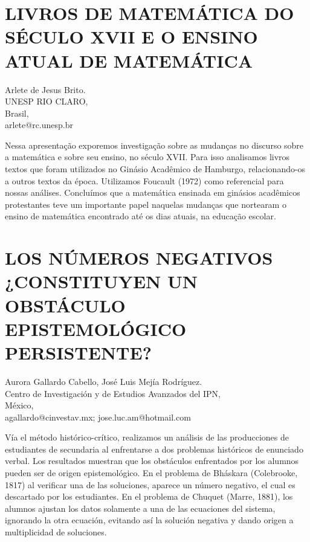 \section{LIVROS DE MATEMÁTICA DO SÉCULO XVII E O ENSINO ATUAL DE MATEMÁTICA}

\begin{datos}
Arlete de Jesus Brito. \\
UNESP RIO CLARO,\\
\hfill Brasil, \\
 \hfill arlete@rc.unesp.br 
\end{datos}

Nessa apresentação exporemos investigação sobre as mudanças no discurso
sobre a matemática e sobre seu ensino, no século XVII. Para isso analisamos
livros textos que foram utilizados no Ginásio Acadêmico de Hamburgo,
relacionando-os a outros textos da época. Utilizamos Foucault (1972)
como referencial para nossas análises. Concluímos que a matemática
ensinada em ginásios acadêmicos protestantes teve um importante papel
naquelas mudanças que nortearam o ensino de matemática encontrado
até os dias atuais, na educação escolar.


\section{LOS NÚMEROS NEGATIVOS ¿CONSTITUYEN UN OBSTÁCULO EPISTEMOLÓGICO PERSISTENTE? }

\begin{datos}
Aurora Gallardo Cabello, José Luis Mejía Rodríguez. \\
Centro de Investigación y de Estudios Avanzados del IPN,\\
\hfill México, \\
 \hfill agallardo@cinvestav.mx; jose.luc.am@hotmail.com 
\end{datos}

Vía el método histórico-crítico, realizamos un análisis de las producciones
de estudiantes de secundaria al enfrentarse a dos problemas históricos
de enunciado verbal. Los resultados muestran que los obstáculos enfrentados
por los alumnos pueden ser de origen epistemológico. En el problema
de Bháskara (Colebrooke, 1817) al verificar una de las soluciones,
aparece un número negativo, el cual es descartado por los estudiantes.
En el problema de Chuquet (Marre, 1881), los alumnos ajustan los datos
solamente a una de las ecuaciones del sistema, ignorando la otra ecuación,
evitando así la solución negativa y dando origen a multiplicidad de
soluciones. 


